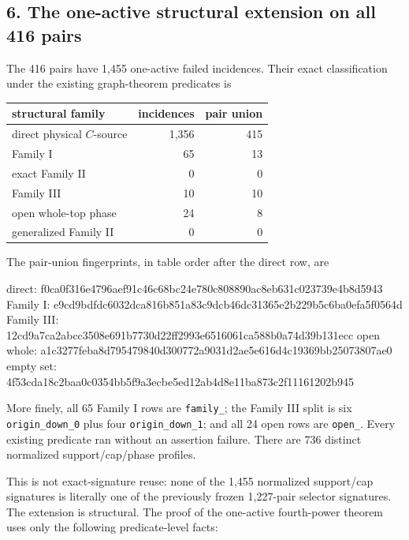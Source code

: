 \subsection{6. The one-active structural extension on all 416
pairs}

The 416 pairs have 1,455 one-active failed incidences. Their exact
classification under the existing graph-theorem predicates is

{\small{} %
\begin{longtable}[]{@{}lrr@{}}
\toprule\noalign{}
structural family & incidences & pair union \\
\midrule\noalign{}
\endhead
\bottomrule\noalign{}
\endlastfoot
direct physical \(C\)-source & 1,356 & 415 \\
Family I & 65 & 13 \\
exact Family II & 0 & 0 \\
Family III & 10 & 10 \\
open whole-top phase & 24 & 8 \\
generalized Family II & 0 & 0 \\
\end{longtable}
}

The pair-union fingerprints, in table order after the direct row, are

\begin{CodeBlock}
direct:       f0ca0f316e4796aef91c46c68bc24e780c808890ac8eb631c023739e4b8d5943
Family I:     e9cd9bdfdc6032dca816b851a83c9dcb46dc31365e2b229b5c6ba0efa5f0564d
Family III:   12cd9a7ca2abcc3508e691b7730d22ff2993e6516061ca588b0a74d39b131ecc
open whole:   a1c3277feba8d795479840d300772a9031d2ae5e616d4c19369bb25073807ae0
empty set:    4f53cda18c2baa0c0354bb5f9a3ecbe5ed12ab4d8e11ba873c2f11161202b945
\end{CodeBlock}

More finely, all 65 Family I rows are
\texttt{family\_\texttt{}}; the Family III split is six
\texttt{origin\_down\_0} plus four \texttt{origin\_down\_1}; and all 24
open rows are \texttt{open\_\texttt{}}. Every existing
predicate ran without an assertion failure. There are 736 distinct
normalized support/cap/phase profiles.

This is not exact-signature reuse: none of the 1,455 normalized
support/cap signatures is literally one of the previously frozen
1,227-pair selector signatures. The extension is structural. The proof
of the one-active fourth-power theorem uses only the following
predicate-level facts:

